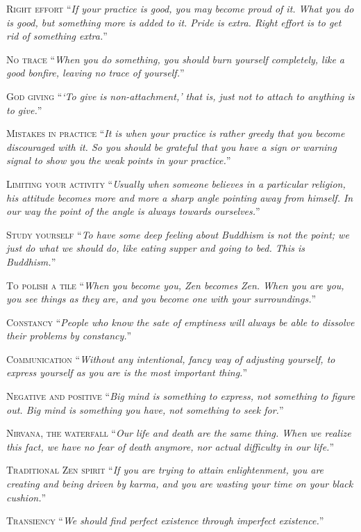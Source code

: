 \documentclass[14pt]{extarticle}
\newcommand{\aphor}[3]{
    \lettrine[lines=2, lraise=0.15]{#1}{#2}
    \enquote{\textit{#3}}
}
\begin{document}
\aphor{R}{ight effort} {If your practice is good, you may become proud of it. What you do is good, but something more is added to it. Pride is extra. Right effort is to get rid of something extra.}

\aphor{N}{o trace} {When you do something, you should burn yourself completely, like a good bonfire, leaving no trace of yourself.}

\aphor{G}{od giving} {\enquote{To give is non-attachment,} that is, just not to attach to anything is to give.}

\aphor{M}{istakes in practice} {It is when your practice is rather greedy that you become discouraged with it. So you should be grateful that you have a sign or warning signal to show you the weak points in your practice.}

\aphor{L}{imiting your activity} {Usually when someone believes in a particular religion, his attitude becomes more and more a sharp angle pointing away from himself. In our way the point of the angle is always towards ourselves.}

\pagebreak

\aphor{S}{tudy yourself} {To have some deep feeling about Buddhism is not the point; we just do what we should do, like eating supper and going to bed. This is Buddhism.}


\aphor{T}{o polish a tile} {When you become you, Zen becomes Zen. When you are you, you see things as they are, and you become one with your surroundings.}

\aphor{C}{onstancy} {People who know the sate of emptiness will always be able to dissolve their problems by constancy.}

\aphor{C}{ommunication} {Without any intentional, fancy way of adjusting yourself, to express yourself as you are is the most important thing.}

\aphor{N}{egative and positive} {Big mind is something to express, not something to figure out. Big mind is something you have, not something to seek for.}

\aphor{N}{irvana, the waterfall} {Our life and death are the same thing. When we realize this fact, we have no fear of death anymore, nor actual difficulty in our life.}

\aphor{T}{raditional Zen spirit} {If you are trying to attain enlightenment, you are creating and being driven by karma, and you are wasting your time on your black cushion.}

\aphor{T}{ransiency} {We should find perfect existence through imperfect existence.}
\end{document}
